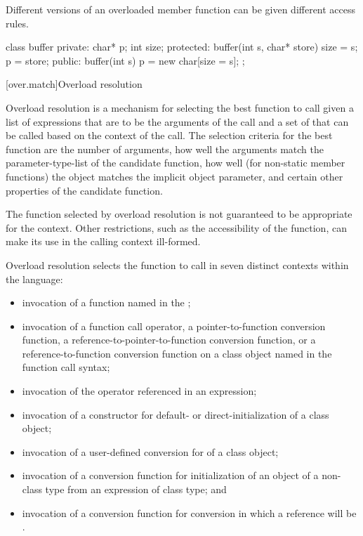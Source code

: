 \pnum
{}%
%
Different versions of an overloaded member function can be given different
access rules.
\begin{example}
\begin{codeblock}
class buffer {
private:
    char* p;
    int size;
protected:
    buffer(int s, char* store) { size = s; p = store; }
public:
    buffer(int s) { p = new char[size = s]; }
};
\end{codeblock}
\end{example}

[over.match]{Overload resolution}%
%
%

\pnum
Overload resolution is a mechanism for selecting the best
function to call given a list of expressions that are to be the
arguments of the call and a set of
that can
be called based on the context of the call.
The selection
criteria for the best function are the number of arguments, how
well the arguments match the parameter-type-list of the
candidate function,
how well (for non-static member functions) the object
matches the implicit object parameter,
and certain other properties of the candidate function.
\begin{note}
The function selected by overload resolution is not
guaranteed to be appropriate for the context.
Other restrictions,
such as the accessibility of the function, can make its use in
the calling context ill-formed.
\end{note}

\pnum
{}%
Overload resolution selects the function to call in seven distinct
contexts within the language:
\begin{itemize}
\item
invocation of a function named in the ;
\item
invocation of a function call operator, a pointer-to-function
conversion function, a reference-to-pointer-to-function conversion
function, or a reference-to-function
conversion function on a class object named in the function
call syntax;
\item
invocation of the operator referenced in an expression;
\item
invocation of a constructor for default- or direct-initialization
of a class object;
\item
invocation of a user-defined conversion for
 of a class object;
\item
invocation of a conversion function for initialization of an object of a
non-class type from an expression of class type; and
\item
invocation of a conversion function for conversion
in which a reference
will be .
\end{itemize}


